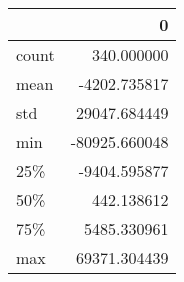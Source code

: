 \begin{tabular}{lr}
\toprule
{} &             0 \\
\midrule
count &    340.000000 \\
mean  &  -4202.735817 \\
std   &  29047.684449 \\
min   & -80925.660048 \\
25\%   &  -9404.595877 \\
50\%   &    442.138612 \\
75\%   &   5485.330961 \\
max   &  69371.304439 \\
\bottomrule
\end{tabular}
